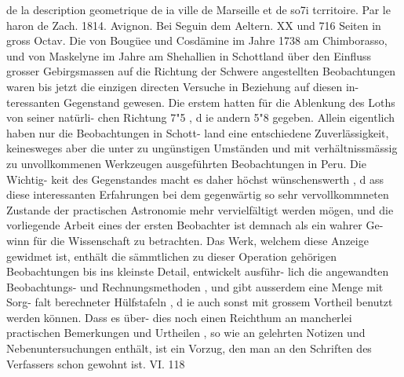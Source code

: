\documentclass[12pt,a4paper]{article}
\begin{document}
de la description geometrique de ia ville de Marseille et de so7i tcrritoire. Par le haron de Zach. 1814.\newline
Avignon. Bei Seguin dem Aeltern. XX und 716 Seiten in gross Octav.\newline
Die von Bougüee und Cosdämine im Jahre 1738 am Chimborasso, und von Maskelyne im Jahre am Shehallien in Schottland über den Einfluss grosser Gebirgsmassen auf die Richtung der Schwere\newline
angestellten Beobachtungen waren bis jetzt die einzigen directen Versuche in Beziehung auf diesen in-\newline
teressanten Gegenstand gewesen. Die erstem hatten für die Ablenkung des Loths von seiner natürli-\newline
chen Richtung 7"5 , d ie andern 5"8 gegeben. Allein eigentlich haben nur die Beobachtungen in Schott-\newline
land eine entschiedene Zuverlässigkeit, keinesweges aber die unter zu ungünstigen Umständen und mit\newline
verhältnissmässig zu unvollkommenen Werkzeugen ausgeführten Beobachtungen in Peru. Die Wichtig-\newline
keit des Gegenstandes macht es daher höchst wünschenswerth , d ass diese interessanten Erfahrungen bei\newline
dem gegenwärtig so sehr vervollkommneten Zustande der practischen Astronomie mehr vervielfältigt\newline
werden mögen, und die vorliegende Arbeit eines der ersten Beobachter ist demnach als ein wahrer Ge-\newline
winn für die Wissenschaft zu betrachten. Das Werk, welchem diese Anzeige gewidmet ist, enthält die\newline
sämmtlichen zu dieser Operation gehörigen Beobachtungen bis ins kleinste Detail, entwickelt ausführ-\newline
lich die angewandten Beobachtungs- und Rechnungsmethoden , und gibt ausserdem eine Menge mit Sorg-\newline
falt berechneter Hülfstafeln , d ie auch sonst mit grossem Vortheil benutzt werden können. Dass es über-\newline
dies noch einen Reichthum an mancherlei practischen Bemerkungen und Urtheilen , so wie an gelehrten\newline
Notizen und Nebenuntersuchungen enthält, ist ein Vorzug, den man an den Schriften des Verfassers\newline
schon gewohnt ist.\newline
VI. 118\newline
\end{document}
